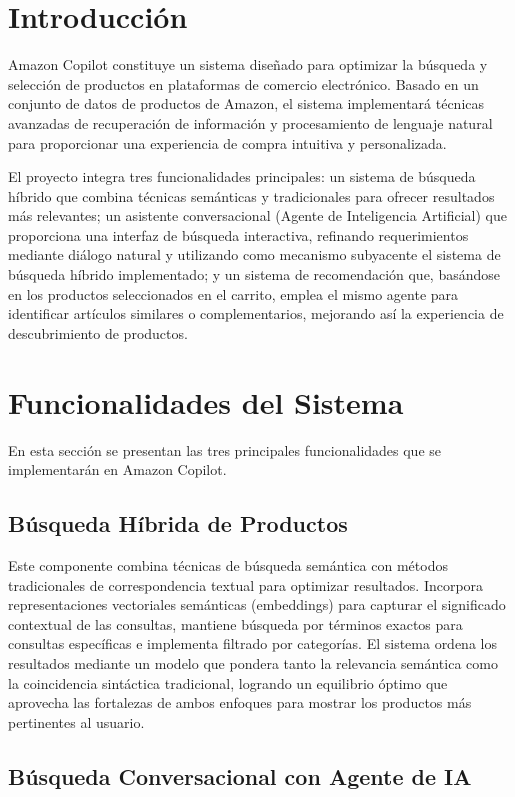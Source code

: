 \documentclass[12pt]{article}
\begin{document}
\section{Introducción}
Amazon Copilot constituye un sistema diseñado para optimizar la búsqueda y selección de productos en plataformas de comercio electrónico. Basado en un conjunto de datos de productos de Amazon, el sistema implementará técnicas avanzadas de recuperación de información y procesamiento de lenguaje natural para proporcionar una experiencia de compra intuitiva y personalizada.

El proyecto integra tres funcionalidades principales: un sistema de búsqueda híbrido que combina técnicas semánticas y tradicionales para ofrecer resultados más relevantes; un asistente conversacional (Agente de Inteligencia Artificial) que proporciona una interfaz de búsqueda interactiva, refinando requerimientos mediante diálogo natural y utilizando como mecanismo subyacente el sistema de búsqueda híbrido implementado; y un sistema de recomendación que, basándose en los productos seleccionados en el carrito, emplea el mismo agente para identificar artículos similares o complementarios, mejorando así la experiencia de descubrimiento de productos.

\section{Funcionalidades del Sistema}

En esta sección se presentan las tres principales funcionalidades que se implementarán en Amazon Copilot.

\subsection{Búsqueda Híbrida de Productos}

Este componente combina técnicas de búsqueda semántica con métodos tradicionales de correspondencia textual para optimizar resultados. Incorpora representaciones vectoriales semánticas (embeddings) para capturar el significado contextual de las consultas, mantiene búsqueda por términos exactos para consultas específicas e implementa filtrado por categorías. El sistema ordena los resultados mediante un modelo que pondera tanto la relevancia semántica como la coincidencia sintáctica tradicional, logrando un equilibrio óptimo que aprovecha las fortalezas de ambos enfoques para mostrar los productos más pertinentes al usuario.

\subsection{Búsqueda Conversacional con Agente de IA}
\end{document}
